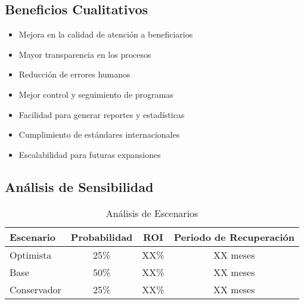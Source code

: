 \subsection{Beneficios Cualitativos}
\begin{itemize}
    \item Mejora en la calidad de atención a beneficiarios
    \item Mayor transparencia en los procesos
    \item Reducción de errores humanos
    \item Mejor control y seguimiento de programas
    \item Facilidad para generar reportes y estadísticas
    \item Cumplimiento de estándares internacionales
    \item Escalabilidad para futuras expansiones
\end{itemize}

\subsection{Análisis de Sensibilidad}
\begin{table}[h!]
\centering
\begin{tabular}{|l|c|c|c|}
\hline
\textbf{Escenario} & \textbf{Probabilidad} & \textbf{ROI} & \textbf{Periodo de Recuperación} \\
\hline
Optimista & 25\% & XX\% & XX meses \\
Base & 50\% & XX\% & XX meses \\
Conservador & 25\% & XX\% & XX meses \\
\hline
\end{tabular}
\caption{Análisis de Escenarios}
\end{table}